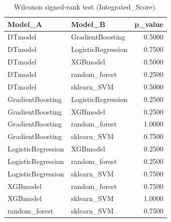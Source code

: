 \begin{table}[t]
\centering
\begin{tabular}{llr}
\toprule
Model_A & Model_B & p_value \\
\midrule
DTmodel & GradientBoosting & 0.5000 \\
DTmodel & LogisticRegression & 0.7500 \\
DTmodel & XGBmodel & 0.5000 \\
DTmodel & random_forest & 0.2500 \\
DTmodel & sklearn_SVM & 0.5000 \\
GradientBoosting & LogisticRegression & 0.2500 \\
GradientBoosting & XGBmodel & 0.2500 \\
GradientBoosting & random_forest & 1.0000 \\
GradientBoosting & sklearn_SVM & 0.7500 \\
LogisticRegression & XGBmodel & 0.2500 \\
LogisticRegression & random_forest & 0.2500 \\
LogisticRegression & sklearn_SVM & 0.7500 \\
XGBmodel & random_forest & 0.7500 \\
XGBmodel & sklearn_SVM & 1.0000 \\
random_forest & sklearn_SVM & 0.7500 \\
\bottomrule
\end{tabular}
\caption{Wilcoxon signed-rank test (Integrated_Score).}
\label{tab:wilcoxon_Integrated_Score}
\end{table}